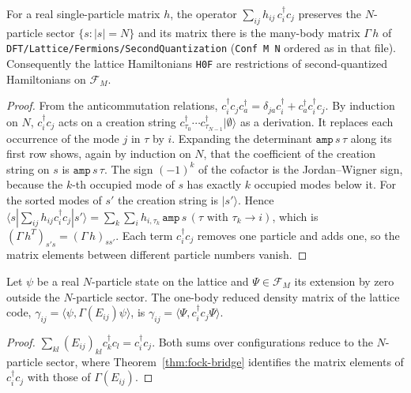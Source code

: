 \begin{theorem}\label{thm:fock-bridge}
  \leanok
  For a real single-particle matrix $h$, the operator $\sum_{ij}h_{ij}\,c_i^\dagger c_j$ preserves the $N$-particle sector
  $\{s:|s|=N\}$ and its matrix there is the many-body matrix $\Gamma\,h$ of \texttt{DFT/Lattice/Fermions/SecondQuantization}
  (\texttt{Conf M N} ordered as in that file). Consequently the lattice Hamiltonians \texttt{H0F} are restrictions of
  second-quantized Hamiltonians on $\mathcal F_M$.
\end{theorem}
\begin{proof}\leanok
  From the anticommutation relations, $c_i^\dagger c_j c_a^\dagger=\delta_{ja}c_i^\dagger+c_a^\dagger c_i^\dagger c_j$. By
  induction on $N$, $c_i^\dagger c_j$ acts on a creation string $c_{\tau_0}^\dagger\cdots c_{\tau_{N-1}}^\dagger|\emptyset\rangle$
  as a derivation. It replaces each occurrence of the mode $j$ in $\tau$ by $i$. Expanding the determinant $\mathtt{amp}\,s\,\tau$
  along its first row shows, again by induction on $N$, that the coefficient of the creation string on $s$ is
  $\mathtt{amp}\,s\,\tau$. The sign $(-1)^k$ of the cofactor is the Jordan–Wigner sign, because the $k$-th occupied mode of
  $s$ has exactly $k$ occupied modes below it. For the sorted modes of $s'$ the creation string is $|s'\rangle$. Hence
  $\langle s|\sum_{ij}h_{ij}c_i^\dagger c_j|s'\rangle=\sum_k\sum_i h_{i,\tau_k}\,\mathtt{amp}\,s\,(\tau\text{ with }\tau_k\to i)$,
  which is $(\Gamma\,h^{T})_{s's}=(\Gamma\,h)_{ss'}$. Each term $c_i^\dagger c_j$ removes one particle and adds one, so the
  matrix elements between different particle numbers vanish.
\end{proof}

\begin{corollary}\label{cor:fock-rdm}
  \leanok
  Let $\psi$ be a real $N$-particle state on the lattice and $\Psi\in\mathcal F_M$ its extension by zero outside the
  $N$-particle sector. The one-body reduced density matrix of the lattice code, $\gamma_{ij}=\langle\psi,\Gamma(E_{ij})\psi\rangle$,
  is $\gamma_{ij}=\langle\Psi,c_i^\dagger c_j\Psi\rangle$.
\end{corollary}
\begin{proof}\leanok
  $\sum_{kl}(E_{ij})_{kl}c_k^\dagger c_l=c_i^\dagger c_j$. Both sums over configurations reduce to the $N$-particle sector,
  where Theorem~\ref{thm:fock-bridge} identifies the matrix elements of $c_i^\dagger c_j$ with those of $\Gamma(E_{ij})$.
\end{proof}

